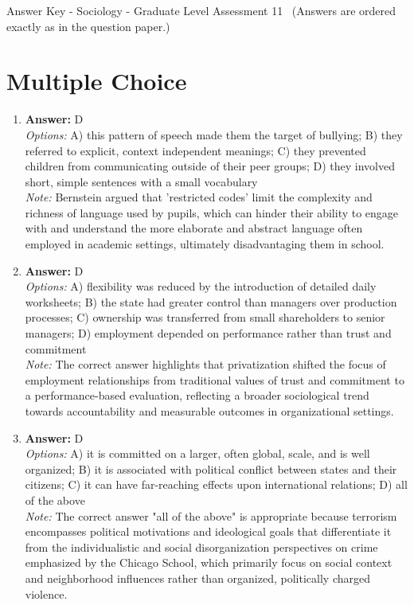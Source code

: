 \documentclass[12pt]{article}
\begin{document}
\begin{center}
Answer Key - Sociology - Graduate Level Assessment 11 \
\small (Answers are ordered exactly as in the question paper.)
\end{center}

\section*{Multiple Choice}
\begin{enumerate}[label=\arabic*.]
\item \textbf{Answer:} D
\\ \textit{Options:} A) this pattern of speech made them the target of bullying; B) they referred to explicit, context independent meanings; C) they prevented children from communicating outside of their peer groups; D) they involved short, simple sentences with a small vocabulary
\\ \textit{Note:} Bernstein argued that 'restricted codes' limit the complexity and richness of language used by pupils, which can hinder their ability to engage with and understand the more elaborate and abstract language often employed in academic settings, ultimately disadvantaging them in school.
\item \textbf{Answer:} D
\\ \textit{Options:} A) flexibility was reduced by the introduction of detailed daily worksheets; B) the state had greater control than managers over production processes; C) ownership was transferred from small shareholders to senior managers; D) employment depended on performance rather than trust and commitment
\\ \textit{Note:} The correct answer highlights that privatization shifted the focus of employment relationships from traditional values of trust and commitment to a performance-based evaluation, reflecting a broader sociological trend towards accountability and measurable outcomes in organizational settings.
\item \textbf{Answer:} D
\\ \textit{Options:} A) it is committed on a larger, often global, scale, and is well organized; B) it is associated with political conflict between states and their citizens; C) it can have far-reaching effects upon international relations; D) all of the above
\\ \textit{Note:} The correct answer "all of the above" is appropriate because terrorism encompasses political motivations and ideological goals that differentiate it from the individualistic and social disorganization perspectives on crime emphasized by the Chicago School, which primarily focus on social context and neighborhood influences rather than organized, politically charged violence.

\end{enumerate}
\end{document}
